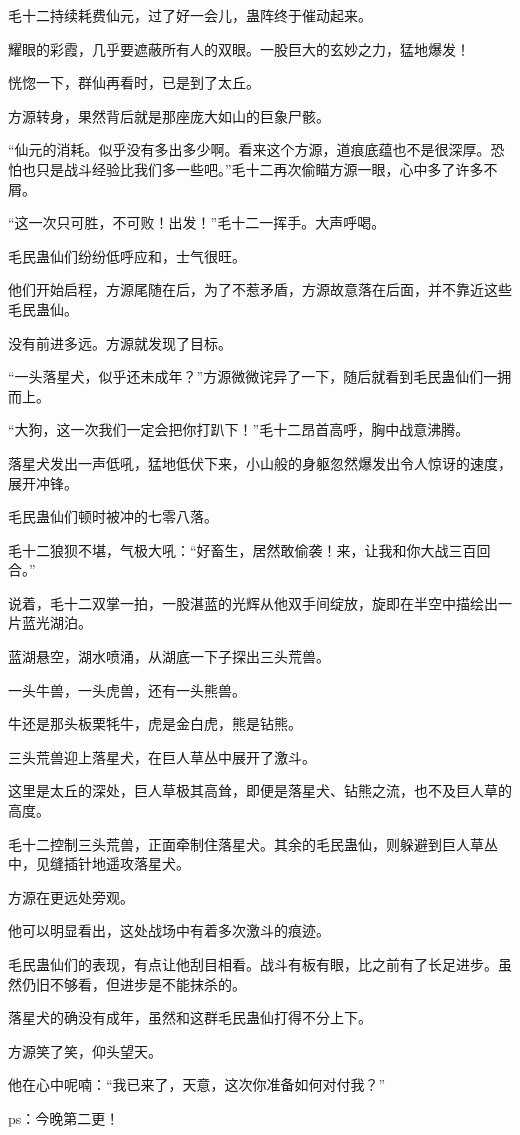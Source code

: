 \begin{this_body}
毛十二持续耗费仙元，过了好一会儿，蛊阵终于催动起来。

耀眼的彩霞，几乎要遮蔽所有人的双眼。一股巨大的玄妙之力，猛地爆发！

恍惚一下，群仙再看时，已是到了太丘。

方源转身，果然背后就是那座庞大如山的巨象尸骸。

“仙元的消耗。似乎没有多出多少啊。看来这个方源，道痕底蕴也不是很深厚。恐怕也只是战斗经验比我们多一些吧。”毛十二再次偷瞄方源一眼，心中多了许多不屑。

“这一次只可胜，不可败！出发！”毛十二一挥手。大声呼喝。

毛民蛊仙们纷纷低呼应和，士气很旺。

他们开始启程，方源尾随在后，为了不惹矛盾，方源故意落在后面，并不靠近这些毛民蛊仙。

没有前进多远。方源就发现了目标。

“一头落星犬，似乎还未成年？”方源微微诧异了一下，随后就看到毛民蛊仙们一拥而上。

“大狗，这一次我们一定会把你打趴下！”毛十二昂首高呼，胸中战意沸腾。

落星犬发出一声低吼，猛地低伏下来，小山般的身躯忽然爆发出令人惊讶的速度，展开冲锋。

毛民蛊仙们顿时被冲的七零八落。

毛十二狼狈不堪，气极大吼：“好畜生，居然敢偷袭！来，让我和你大战三百回合。”

说着，毛十二双掌一拍，一股湛蓝的光辉从他双手间绽放，旋即在半空中描绘出一片蓝光湖泊。

蓝湖悬空，湖水喷涌，从湖底一下子探出三头荒兽。

一头牛兽，一头虎兽，还有一头熊兽。

牛还是那头板栗牦牛，虎是金白虎，熊是钻熊。

三头荒兽迎上落星犬，在巨人草丛中展开了激斗。

这里是太丘的深处，巨人草极其高耸，即便是落星犬、钻熊之流，也不及巨人草的高度。

毛十二控制三头荒兽，正面牵制住落星犬。其余的毛民蛊仙，则躲避到巨人草丛中，见缝插针地遥攻落星犬。

方源在更远处旁观。

他可以明显看出，这处战场中有着多次激斗的痕迹。

毛民蛊仙们的表现，有点让他刮目相看。战斗有板有眼，比之前有了长足进步。虽然仍旧不够看，但进步是不能抹杀的。

落星犬的确没有成年，虽然和这群毛民蛊仙打得不分上下。

方源笑了笑，仰头望天。

他在心中呢喃：“我已来了，天意，这次你准备如何对付我？”

ps：今晚第二更！

\end{this_body}

